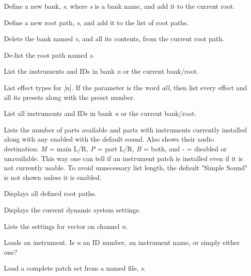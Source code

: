       Define a new bank, \textsl{s}, where \textsl{s} is a bank name,
      and add it to the current root.

      Define a new root path, \textsl{s}, and add it to the list of root paths.

      Delete the bank named \textsl{s}, and all its contents,
      from the current root path.

      De-list the root path named \textsl{s}.

      List the instruments and IDs in bank \textsl{n} or the
      current bank/root.

      List effect types for \textsl[n].
      If the parameter is the word \textsl{all},
      then list every effect and all its
      presets along with the preset number.

      List all instruments and IDs in bank \textsl{n}
      or the current bank/root.

      Lists the number of parts available and parts with instruments
      currently installed along with any enabled with the default sound.
      Also shows their audio destination:
      \textsl{M} = main L/R, \textsl{P} = part L/R, \textsl{B} = both, and
      \textsl{-} = disabled or unavailable.
      This way one can tell if an instrument patch is installed even if it is
      not currently usable.
      To avoid unnecessary list length, the default "Simple Sound" is not shown
      unless it is enabled.

      Displays all defined root paths.

      Displays the current dynamic system settings.

      Lists the settings for vector on channel \textsl{n}.

      Loads an instrument.
      Is \textsl{n} an ID number, an instrument name, or simply either one?

      Load a complete patch set from a named file, \textsl{s}.

